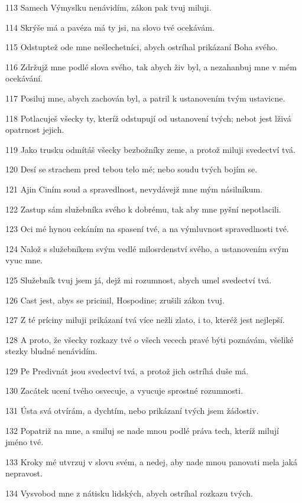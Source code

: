 \par 113 Samech Výmyslku nenávidím, zákon pak tvuj miluji.
\par 114 Skrýše má a pavéza má ty jsi, na slovo tvé ocekávám.
\par 115 Odstuptež ode mne nešlechetníci, abych ostríhal prikázaní Boha svého.
\par 116 Zdržujž mne podlé slova svého, tak abych živ byl, a nezahanbuj mne v mém ocekávání.
\par 117 Posiluj mne, abych zachován byl, a patril k ustanovením tvým ustavicne.
\par 118 Potlacuješ všecky ty, kteríž odstupují od ustanovení tvých; nebot jest lživá opatrnost jejich.
\par 119 Jako trusku odmítáš všecky bezbožníky zeme, a protož miluji svedectví tvá.
\par 120 Desí se strachem pred tebou telo mé; nebo soudu tvých bojím se.
\par 121 Ajin Ciním soud a spravedlnost, nevydávejž mne mým násilníkum.
\par 122 Zastup sám služebníka svého k dobrému, tak aby mne pyšní nepotlacili.
\par 123 Oci mé hynou cekáním na spasení tvé, a na výmluvnost spravedlnosti tvé.
\par 124 Nalož s služebníkem svým vedlé milosrdenství svého, a ustanovením svým vyuc mne.
\par 125 Služebník tvuj jsem já, dejž mi rozumnost, abych umel svedectví tvá.
\par 126 Cast jest, abys se pricinil, Hospodine; zrušili zákon tvuj.
\par 127 Z té príciny miluji prikázaní tvá více nežli zlato, i to, kteréž jest nejlepší.
\par 128 A proto, že všecky rozkazy tvé o všech vecech pravé býti poznávám, všeliké stezky bludné nenávidím.
\par 129 Pe Predivnát jsou svedectví tvá, a protož jich ostríhá duše má.
\par 130 Zacátek ucení tvého osvecuje, a vyucuje sprostné rozumnosti.
\par 131 Ústa svá otvírám, a dychtím, nebo prikázaní tvých jsem žádostiv.
\par 132 Popatriž na mne, a smiluj se nade mnou podlé práva tech, kteríž milují jméno tvé.
\par 133 Kroky mé utvrzuj v slovu svém, a nedej, aby nade mnou panovati mela jaká nepravost.
\par 134 Vysvobod mne z nátisku lidských, abych ostríhal rozkazu tvých.
